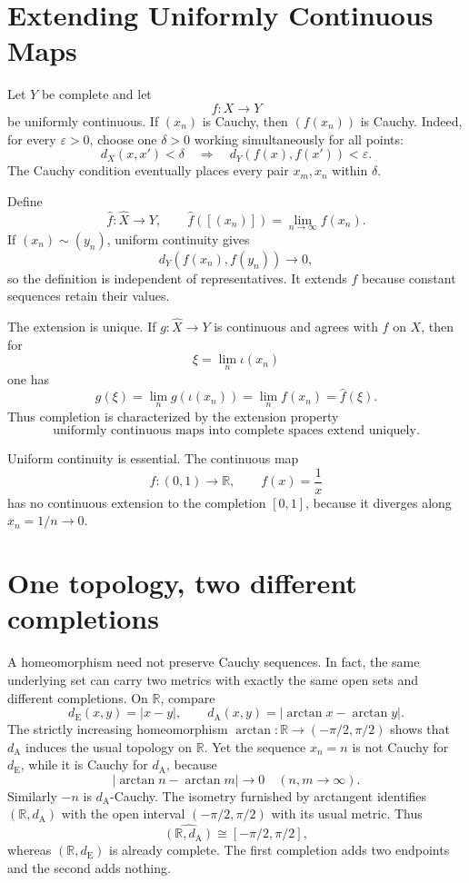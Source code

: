\section{Extending Uniformly Continuous Maps}

Let \(Y\) be complete and let
\[
  f:X\to Y
\]
be uniformly continuous.  If \((x_n)\) is Cauchy, then \((f(x_n))\) is Cauchy.  Indeed, for every \(\varepsilon>0\), choose one \(\delta>0\) working simultaneously for all points:
\[
  d_X(x,x')<\delta
  \quad\Longrightarrow\quad
  d_Y(f(x),f(x'))<\varepsilon.
\]
The Cauchy condition eventually places every pair \(x_m,x_n\) within \(\delta\).

Define
\[
  \widehat f:\widehat X\to Y,
  \qquad
  \widehat f([(x_n)])
  =\lim_{n\to\infty}f(x_n).
\]
If \((x_n)\sim(y_n)\), uniform continuity gives
\[
  d_Y(f(x_n),f(y_n))\longrightarrow0,
\]
so the definition is independent of representatives.  It extends \(f\) because constant sequences retain their values.

The extension is unique.  If \(g:\widehat X\to Y\) is continuous and agrees with \(f\) on \(X\), then for
\[
  \xi=\lim_n\iota(x_n)
\]
one has
\[
  g(\xi)
  =\lim_ng(\iota(x_n))
  =\lim_nf(x_n)
  =\widehat f(\xi).
\]
Thus completion is characterized by the extension property
\[
  \boxed{
  \text{uniformly continuous maps into complete spaces extend uniquely}.}
\]

Uniform continuity is essential.  The continuous map
\[
  f:(0,1)\to\mathbb R,
  \qquad
  f(x)=\frac1x
\]
has no continuous extension to the completion \([0,1]\), because it diverges along \(x_n=1/n\to0\).

\section{One topology, two different completions}

A homeomorphism need not preserve Cauchy sequences. In fact, the same underlying set can carry two metrics with exactly the same open sets and different completions. On $\mathbb R$, compare
\[
 d_{\mathrm E}(x,y)=|x-y|,\qquad
 d_{\mathrm A}(x,y)=|\arctan x-\arctan y|.
\]
The strictly increasing homeomorphism $\arctan:\mathbb R\to(-\pi/2,\pi/2)$ shows that $d_{\mathrm A}$ induces the usual topology on $\mathbb R$. Yet the sequence $x_n=n$ is not Cauchy for $d_{\mathrm E}$, while it is Cauchy for $d_{\mathrm A}$, because
\[
 |\arctan n-\arctan m|\longrightarrow0
 \quad(n,m\to\infty).
\]
Similarly $-n$ is $d_{\mathrm A}$-Cauchy. The isometry furnished by arctangent identifies $(\mathbb R,d_{\mathrm A})$ with the open interval $(-\pi/2,\pi/2)$ with its usual metric. Thus
\[
 \widehat{(\mathbb R,d_{\mathrm A})}
 \cong[-\pi/2,\pi/2],
\]
whereas $(\mathbb R,d_{\mathrm E})$ is already complete. The first completion adds two endpoints and the second adds nothing.

